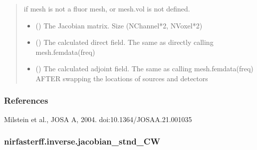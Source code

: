 \documentclass[letterpaper,10pt,english]{sphinxmanual}
\begin{document}
\begin{fulllineitems}
\begin{quote}
\begin{description}
\begin{itemize}
\end{itemize}

\sphinxAtStartPar
{} \textendash{} if mesh is not a fluor mesh, or mesh.vol is not defined.

\sphinxAtStartPar
\begin{itemize}
\item {} 
\sphinxAtStartPar
{} () \textendash{} The Jacobian matrix. Size (NChannel*2, NVoxel*2)

\item {} 
\sphinxAtStartPar
{} () \textendash{} The calculated direct field. The same as directly calling mesh.femdata(freq)

\item {} 
\sphinxAtStartPar
{} () \textendash{} The calculated adjoint field. The same as calling mesh.femdata(freq) AFTER swapping the locations of sources and detectors

\end{itemize}


\end{description}\end{quote}
\subsubsection*{References}

\sphinxAtStartPar
Milstein et al., JOSA A, 2004. doi:10.1364/JOSAA.21.001035

\end{fulllineitems}


\sphinxstepscope


\subsubsection{nirfasterff.inverse.jacobian\_stnd\_CW}
\label{\detokenize{_autosummary/nirfasterff.inverse.jacobian_stnd_CW:nirfasterff-inverse-jacobian-stnd-cw}}\label{\detokenize{_autosummary/nirfasterff.inverse.jacobian_stnd_CW::doc}}
\end{document}
